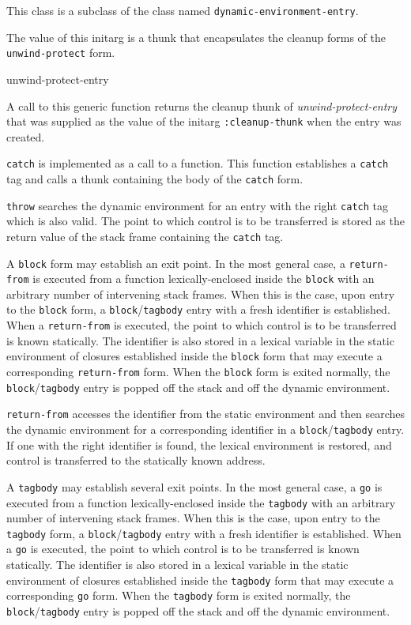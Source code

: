 This class is a subclass of the class named
\texttt{dynamic-environment-entry}.


The value of this initarg is a thunk that encapsulates the cleanup
forms of the \texttt{unwind-protect} form.

 {unwind-protect-entry}

A call to this generic function returns the cleanup thunk of
\textit{unwind-protect-entry} that was supplied as the value of the
initarg \texttt{:cleanup-thunk} when the entry was created.

\texttt{catch} is implemented as a call to a function.  This function
establishes a \texttt{catch} tag and calls a thunk containing the body
of the \texttt{catch} form.

\texttt{throw} searches the dynamic environment for an entry with the
right \texttt{catch} tag which is also valid.  The point to which
control is to be transferred is stored as the return value of the
stack frame containing the \texttt{catch} tag.

A \texttt{block} form may establish an exit point.  In the most
general case, a \texttt{return-from} is executed from a function
lexically-enclosed inside the \texttt{block} with an arbitrary number
of intervening stack frames.  When this is the case, upon entry to the
\texttt{block} form, a \texttt{block}/\texttt{tagbody} entry with a
fresh identifier is established.  When a \texttt{return-from} is
executed, the point to which control is to be transferred is known
statically.  The identifier is also stored in a lexical variable in
the static environment of closures established inside the
\texttt{block} form that may execute a corresponding
\texttt{return-from} form.  When the \texttt{block} form is exited normally, the
\texttt{block}/\texttt{tagbody} entry is popped off the stack and off
the dynamic environment.

\texttt{return-from} accesses the identifier from the static
environment and then searches the dynamic environment for a
corresponding identifier in a \texttt{block}/\texttt{tagbody} entry.
If one with the right identifier is found, the lexical environment is
restored, and control is transferred to the statically known address.

A \texttt{tagbody} may establish several exit points.  In the most
general case, a \texttt{go} is executed from a function
lexically-enclosed inside the \texttt{tagbody} with an arbitrary
number of intervening stack frames.  When this is the case, upon entry
to the \texttt{tagbody} form, a \texttt{block}/\texttt{tagbody} entry
with a fresh identifier is established.  When a \texttt{go} is
executed, the point to which control is to be transferred is known
statically.  The identifier is also stored in a lexical variable in
the static environment of closures established inside the
\texttt{tagbody} form that may execute a corresponding \texttt{go}
form.  When the \texttt{tagbody} form is exited normally, the
\texttt{block}/\texttt{tagbody} entry is popped off the stack and off
the dynamic environment.

